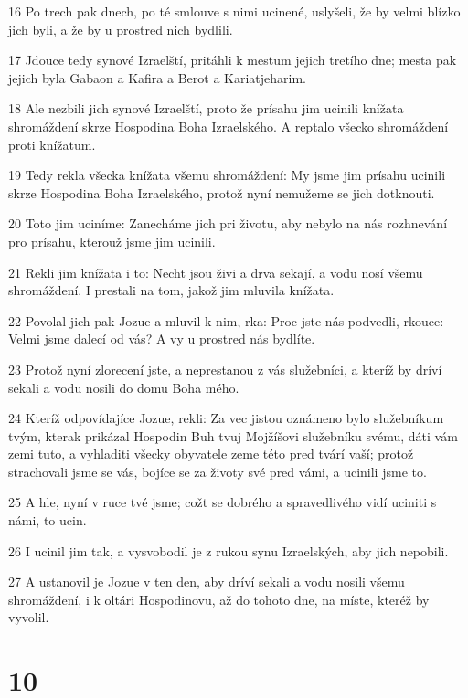 \par 16 Po trech pak dnech, po té smlouve s nimi ucinené, uslyšeli, že by velmi blízko jich byli, a že by u prostred nich bydlili.
\par 17 Jdouce tedy synové Izraelští, pritáhli k mestum jejich tretího dne; mesta pak jejich byla Gabaon a Kafira a Berot a Kariatjeharim.
\par 18 Ale nezbili jich synové Izraelští, proto že prísahu jim ucinili knížata shromáždení skrze Hospodina Boha Izraelského. A reptalo všecko shromáždení proti knížatum.
\par 19 Tedy rekla všecka knížata všemu shromáždení: My jsme jim prísahu ucinili skrze Hospodina Boha Izraelského, protož nyní nemužeme se jich dotknouti.
\par 20 Toto jim uciníme: Zanecháme jich pri životu, aby nebylo na nás rozhnevání pro prísahu, kterouž jsme jim ucinili.
\par 21 Rekli jim knížata i to: Necht jsou živi a drva sekají, a vodu nosí všemu shromáždení. I prestali na tom, jakož jim mluvila knížata.
\par 22 Povolal jich pak Jozue a mluvil k nim, rka: Proc jste nás podvedli, rkouce: Velmi jsme dalecí od vás? A vy u prostred nás bydlíte.
\par 23 Protož nyní zlorecení jste, a neprestanou z vás služebníci, a kteríž by dríví sekali a vodu nosili do domu Boha mého.
\par 24 Kteríž odpovídajíce Jozue, rekli: Za vec jistou oznámeno bylo služebníkum tvým, kterak prikázal Hospodin Buh tvuj Mojžíšovi služebníku svému, dáti vám zemi tuto, a vyhladiti všecky obyvatele zeme této pred tvárí vaší; protož strachovali jsme se vás, bojíce se za životy své pred vámi, a ucinili jsme to.
\par 25 A hle, nyní v ruce tvé jsme; cožt se dobrého a spravedlivého vidí uciniti s námi, to ucin.
\par 26 I ucinil jim tak, a vysvobodil je z rukou synu Izraelských, aby jich nepobili.
\par 27 A ustanovil je Jozue v ten den, aby dríví sekali a vodu nosili všemu shromáždení, i k oltári Hospodinovu, až do tohoto dne, na míste, kteréž by vyvolil.

\chapter{10}

